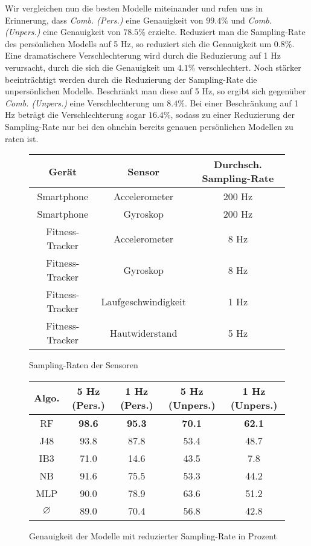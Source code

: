 Wir vergleichen nun die besten Modelle miteinander und rufen uns in Erinnerung, dass \textit{Comb. (Pers.)} eine Genauigkeit von $99.4 \%$ und \textit{Comb. (Unpers.)} eine Genauigkeit von $78.5 \%$ erzielte. Reduziert man die Sampling-Rate des persönlichen Modells auf 5 Hz, so reduziert sich die Genauigkeit um $0.8 \%$. Eine dramatischere Verschlechterung wird durch die Reduzierung auf 1 Hz verursacht, durch die sich die Genauigkeit um $4.1 \%$ verschlechtert. Noch stärker beeinträchtigt werden durch die Reduzierung der Sampling-Rate die unpersönlichen Modelle. Beschränkt man diese auf 5 Hz, so ergibt sich gegenüber \textit{Comb. (Unpers.)} eine Verschlechterung um $8.4 \%$. Bei einer Beschränkung auf 1 Hz beträgt die Verschlechterung sogar $16.4 \%$, sodass zu einer Reduzierung der Sampling-Rate nur bei den ohnehin bereits genauen persönlichen Modellen zu raten ist.

\begin{figure}
\centering
\begin{tabular}{|c|c|c|}
	\hline 
	\textbf{Gerät} & \textbf{Sensor} & \textbf{Durchsch. Sampling-Rate} \\ 
	\hline 
	Smartphone & Accelerometer & 200 Hz \\ 
	\hline 
	Smartphone & Gyroskop & 200 Hz \\ 
	\hline 
	Fitness-Tracker & Accelerometer & 8 Hz \\ 
	\hline 
	Fitness-Tracker & Gyroskop & 8 Hz \\ 
	\hline 
	Fitness-Tracker & Laufgeschwindigkeit & 1 Hz \\ 
	\hline 
	Fitness-Tracker & Hautwiderstand & 5 Hz \\ 
	\hline 
\end{tabular}
\caption{Sampling-Raten der Sensoren}
\label{fig:sampling-rates}
\end{figure}

\begin{figure}
\centering
\begin{tabular}{|c|c|c||c|c|}
	\hline 
	\textbf{Algo.} & \textbf{5 Hz (Pers.)} & \textbf{1 Hz (Pers.)} &\textbf{5 Hz (Unpers.)} & \textbf{1 Hz (Unpers.)} \\ 
	\hline 
	RF & \textbf{98.6} & \textbf{95.3} & \textbf{70.1} & \textbf{62.1} \\ 
	J48 & 93.8 & 87.8 & 53.4 & 48.7 \\ 
	IB3 & 71.0 & 14.6 & 43.5 & 7.8 \\ 
	NB & 91.6 & 75.5 & 53.3 & 44.2 \\ 
	MLP & 90.0 & 78.9 & 63.6 & 51.2 \\ 
	\hline 
	$\varnothing$ & 89.0 & 70.4 & 56.8 & 42.8 \\ 
	\hline
\end{tabular} 
\caption{Genauigkeit der Modelle mit reduzierter Sampling-Rate in Prozent}
\label{fig:accuracy-sampling_rate}
\end{figure}


